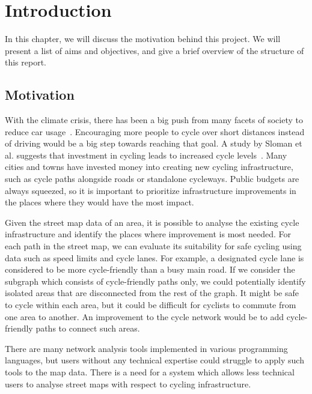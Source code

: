 \documentclass[12pt,a4paper]{report}
\begin{document}
\clearpage
\setcounter{page}{1}

\tableofcontents

\listoffigures

\newpage
{}

\chapter{Introduction}
In this chapter, we will discuss the motivation behind this project. We will present a list of aims and objectives, and give a brief overview of the structure of this report.

\section{Motivation}
With the climate crisis, there has been a big push from many facets of society to reduce car usage~\cite{CHAPMAN2007354}. Encouraging more people to cycle over short distances instead of driving would be a big step towards reaching that goal. A study by Sloman et al. suggests that investment in cycling leads to increased cycle levels~\cite{Sloman2009}. Many cities and towns have invested money into creating new cycling infrastructure, such as cycle paths alongside roads or standalone cycleways. Public budgets are always squeezed, so it is important to prioritize infrastructure improvements in the places where they would have the most impact. 

Given the street map data of an area, it is possible to analyse the existing cycle infrastructure and identify the places where improvement is most needed. For each path in the street map, we can evaluate its suitability for safe cycling using data such as speed limits and cycle lanes. For example, a designated cycle lane is considered to be more cycle-friendly than a busy main road. If we consider the subgraph which consists of cycle-friendly paths only, we could potentially identify isolated areas that are disconnected from the rest of the graph. It might be safe to cycle within each area, but it could be difficult for cyclists to commute from one area to another. An improvement to the cycle network would be to add cycle-friendly paths to connect such areas.

There are many network analysis tools implemented in various programming languages, but users without any technical expertise could struggle to apply such tools to the map data. There is a need for a system which allows less technical users to analyse street maps with respect to cycling infrastructure.
\end{document}
